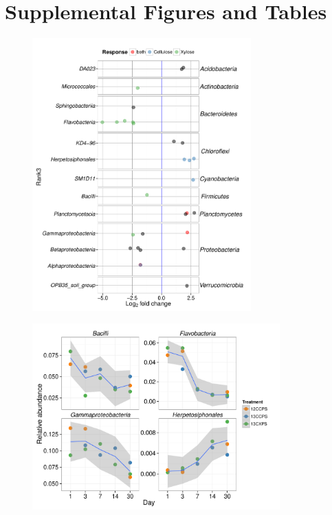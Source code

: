 \thispagestyle{empty}


\section{Supplemental Figures and Tables}

\begin{figure}[H] \begin{center}
\centerline{\includegraphics[width=0.75\textwidth]{figures/l2fc_time/l2fc_time.pdf}}
\caption{\protect}\label{fig:time}
\end{center} \end{figure}

\begin{figure}[H]
	\begin{center}
    \centerline{\includegraphics[width=0.85\textwidth]{figures/abndVtime_class/abndVtime_class.pdf}}
	\caption{\protect}\label{fig:time_class}
    \end{center}
\end{figure}

